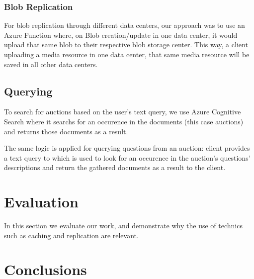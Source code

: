 \documentclass[runningheads]{llncs}
\begin{document}

\subsubsection{Blob Replication}

For blob replication through different data centers, our approach was to use an Azure Function where, on Blob creation/update in one data center, it would upload that same blob to their respective blob storage center. This way, a client uploading a media resource in one data center, that same media resource will be saved in all other data centers.

\subsection{Querying}

To search for auctions based on the user's text query, we use Azure Cognitive Search where it searchs for an occurence in the documents (this case auctions) and returns those documents as a result.

The same logic is applied for querying questions from an auction: client provides a text query to which is used to look for an occurence in the auction's questions' descriptions and return the gathered documents as a result to the client.

\section{Evaluation}

In this section we evaluate our work, and demonstrate why the use of technics such as caching and replication are relevant.


\section{Conclusions}

\end{document}
